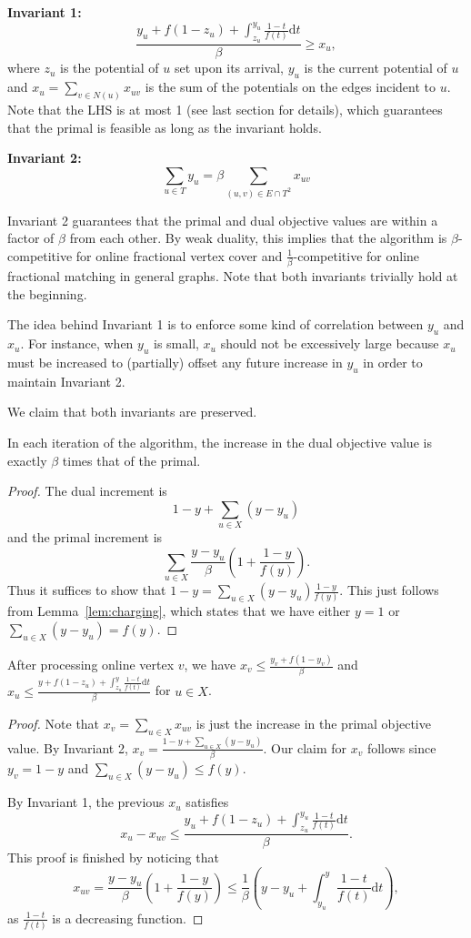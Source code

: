 \documentclass{article}
\begin{document}
\textbf{Invariant 1:} $$\frac{y_{u}+f(1-z_u)+\int_{z_u}^{y_{u}}\frac{1-t}{f(t)}\mathrm{d}t}{\beta}\geq x_{u},$$ where $z_u$ is the potential of $u$ set upon its arrival, $y_u$ is the current potential of $u$ and $x_u = \sum_{v \in N(u)} x_{uv}$ is the sum of the potentials on the edges incident to $u$. Note that the LHS is at most 1 (see last section for details), which guarantees that the primal is feasible as long as the invariant holds.

\textbf{Invariant 2:} $$\sum_{u\in T} y_{u}=\beta\sum_{(u,v)\in E\cap T^2} x_{uv}$$

Invariant 2 guarantees that the primal and dual objective values are within a factor of $\beta$ from each other. By weak duality, this implies that the algorithm is $\beta$-competitive for online fractional vertex cover and $\frac{1}{\beta}$-competitive for online fractional matching in general graphs.
Note that both invariants trivially hold at the beginning. 

The idea behind Invariant 1 is to enforce some kind of correlation between $y_u$ and $x_u$. For instance, when $y_u$ is small, $x_u$ should not be excessively large because $x_u$ must be increased to (partially) offset any future increase in $y_u$ in order to maintain Invariant 2.



We claim that both invariants are preserved.
\begin{lemma}[Invariant 2]
\label{lem:inv2}
In each iteration of the algorithm, the increase in the dual objective value is exactly $\beta$ times that of the primal.
\end{lemma}
\begin{proof}
The dual increment is $$1-y+\sum_{u\in X}(y-y_u)$$ and the primal increment is $$\sum_{u\in X} \frac{y-y_u}{\beta}\left( 1 + \frac{1-y}{f(y)}\right).$$
Thus it suffices to show that $1-y=\sum_{u\in X}(y-y_u)\frac{1-y}{f(y)}$. This just follows from Lemma~\ref{lem:charging}, which states that we have either $y=1$ or $\sum_{u\in X}(y-y_u)=f(y)$.
\end{proof}
\begin{lemma}[Invariant 1]
\label{lem:inv1}
After processing online vertex $v$, we have $x_v\leq \frac{y_v+f(1-y_v)}{\beta}$ and $x_u\leq \frac{y+f(1-z_u)+\int_{z_u}^{y}\frac{1-t}{f(t)}\mathrm{d}t}{\beta}$ for $u\in X$.
\end{lemma}
\begin{proof}
Note that $x_v=\sum_{u\in X}x_{uv}$ is just the increase in the primal objective value. By Invariant 2, $x_v=\frac{1-y+\sum_{u\in X}(y-y_u)}{\beta}$. Our claim for $x_v$ follows since $y_v=1-y$ and $\sum_{u\in X}(y-y_u)\leq f(y)$.

By Invariant 1, the previous $x_u$ satisfies $$x_u-x_{uv}\leq\frac{y_{u}+f(1-z_u)+\int_{z_u}^{y_{u}}\frac{1-t}{f(t)}\mathrm{d}t}{\beta}.$$
This proof is finished by noticing that $$x_{uv}=\frac{y-y_u}{\beta}\left( 1 + \frac{1-y}{f(y)}\right)\leq  \frac{1}{\beta} \left( y-y_u+ \int_{y_u}^y \frac{1-t}{f(t)}\mathrm{d}t\right),$$ as $\frac{1-t}{f(t)}$ is a decreasing function.
\end{proof}
\end{document}
